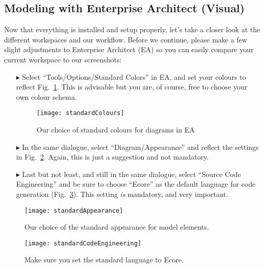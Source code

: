 \visHeader

\subsection{Modeling with Enterprise Architect (Visual)}

Now\hypertarget{projectStructure vis}{} that everything is installed and setup properly, let's take a closer look at the different workspaces and our workflow.
Before we continue, please make a few slight adjustments to Enterprise Architect (EA) so you can easily compare your current workspace to our screenshots:
\begin{itemize}

\item[$\blacktriangleright$] Select ``Tools/Options/Standard Colors'' in EA, and set your colours to reflect Fig.~\ref{fig_standardColoursEA}.
This is advisable but you are, of course, free to choose your own colour schema.

\begin{figure}[htbp]
  \centering
  \texttt{[image: standardColours]}
  \caption{Our choice of standard colours for diagrams in EA}
  \label{fig_standardColoursEA}
\end{figure}

\item[$\blacktriangleright$] In the same dialogue, select ``Diagram/Appearance'' and reflect the settings in Fig.~\ref{fig_standardAppearanceEA}.
Again, this is just a suggestion and not mandatory.

\item[$\blacktriangleright$] Last but not least, and still in the same dialogue, select ``Source Code Engineering'' and be sure to choose ``Ecore'' as the
default language for code generation (Fig.~\ref{fig_standardSCEEA}). This setting \emph{is} mandatory, and very important.
\end{itemize}

\begin{figure}[htbp]
  \centering
  \texttt{[image: standardAppearance]}
  \caption{Our choice of the standard appearance for model elements.}
  \label{fig_standardAppearanceEA}
\end{figure}

\begin{figure}[htbp]
    \centering
    \texttt{[image: standardCodeEngineering]}
    \caption{Make sure you set the standard language to Ecore.}
    \label{fig_standardSCEEA}
 \end{figure}
 
